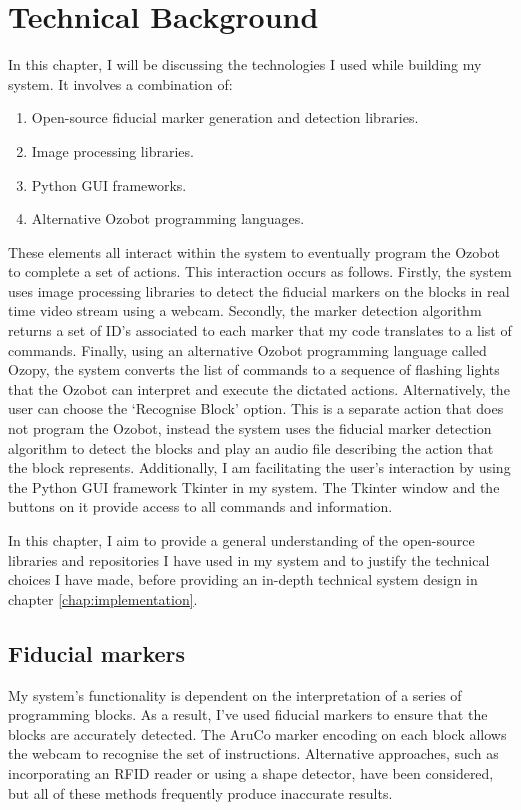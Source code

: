 \documentclass[oneside,%
                    author={Malak Hajji},
                    degree={BSc},
                    title={Designing An Accessible Computational Toolkit For Students},
                  subtitle={With Mixed Visual Abilities}]{dissertation}
\begin{document}

\chapter{Technical Background}
\label{chap:technical}



\noindent
In this chapter, I will be discussing the technologies I used while building my system. It involves a combination of:

\begin{enumerate}
\item Open-source fiducial marker generation and detection libraries.
\item Image processing libraries.
\item Python GUI frameworks. 
\item Alternative Ozobot programming languages.
\end{enumerate}

\noindent
These elements all interact within the system to eventually program the Ozobot to complete a set of actions. This interaction occurs as follows.
Firstly, the system uses image processing libraries to detect the fiducial markers on the blocks in real time video stream using a webcam. Secondly, the marker detection algorithm returns a set of ID’s associated to each marker that my code translates to a list of commands. Finally, using an alternative Ozobot programming language called Ozopy, the system converts the list of commands to a sequence of flashing lights that the Ozobot can interpret and execute the dictated actions. 
Alternatively, the user can choose the ‘Recognise Block’ option. This is a separate action that does not program the Ozobot, instead the system uses the fiducial marker detection algorithm to detect the blocks and play an audio file describing the action that the block represents. 
Additionally, I am facilitating the user’s interaction by using the Python GUI framework Tkinter in my system. The Tkinter window and the buttons on it provide access to all commands and information. 

In this chapter, I aim to provide a general understanding of the open-source libraries and repositories I have used in my system and to justify the technical choices I have made, before providing an in-depth technical system design in chapter \ref{chap:implementation}.

\section{Fiducial markers}
\noindent
My system's functionality is dependent on the interpretation of a series of programming blocks. As a result, I've used fiducial markers to ensure that the blocks are accurately detected. The AruCo marker encoding on each block allows the webcam to recognise the set of instructions. 
Alternative approaches, such as incorporating an RFID reader or using a shape detector, have been considered, but all of these methods frequently produce inaccurate results.
\end{document}
